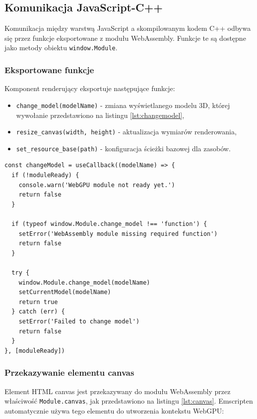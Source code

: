 \subsection{Komunikacja JavaScript-C++}

Komunikacja między warstwą JavaScript a skompilowanym kodem C++ odbywa się przez funkcje eksportowane z modułu WebAssembly. Funkcje te są dostępne jako metody obiektu \texttt{window.Module}.

\subsubsection{Eksportowane funkcje}

Komponent renderujący eksportuje następujące funkcje:

\begin{itemize}
  \item \texttt{change\_model(modelName)} - zmiana wyświetlanego modelu 3D, której wywołanie przedstawiono na listingu \ref{lst:changemodel},
  \item \texttt{resize\_canvas(width, height)} - aktualizacja wymiarów renderowania,
  \item \texttt{set\_resource\_base(path)} - konfiguracja ścieżki bazowej dla zasobów.
\end{itemize}

\begin{lstlisting}[style=javascript, caption={Wywołanie funkcji eksportowanej z C++}, label={lst:changemodel}]
const changeModel = useCallback((modelName) => {
  if (!moduleReady) {
    console.warn('WebGPU module not ready yet.')
    return false
  }

  if (typeof window.Module.change_model !== 'function') {
    setError('WebAssembly module missing required function')
    return false
  }

  try {
    window.Module.change_model(modelName)
    setCurrentModel(modelName)
    return true
  } catch (err) {
    setError('Failed to change model')
    return false
  }
}, [moduleReady])
\end{lstlisting}

\subsubsection{Przekazywanie elementu canvas}

Element HTML canvas jest przekazywany do modułu WebAssembly przez właściwość \texttt{Module.canvas}, jak przedstawiono na listingu \ref{lst:canvas}. Emscripten automatycznie używa tego elementu do utworzenia kontekstu WebGPU:

